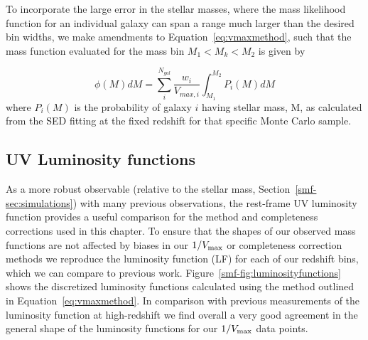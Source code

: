 To incorporate the large error in the stellar masses, where the mass likelihood function for an individual galaxy can span a range much larger than the desired bin widths, we make amendments to Equation~\ref{eq:vmaxmethod}, such that the mass function evaluated for the mass bin $M_{1} < M_{k} < M_{2}$ is given by

\begin{equation}\label{eq:vmaxpdf}
\phi(M) dM = \sum_{i}^{N_{gal}}  \frac{w_{i}}{V_{max,i}} \int_{M_{1}}^{M_{2}} P_{i}(M)dM
\end{equation}
where $P_{i}(M)$ is the probability of galaxy $i$ having stellar mass, M, as calculated from the SED fitting at the fixed redshift for that specific Monte Carlo sample.

\subsection{UV Luminosity functions}
As a more robust observable (relative to the stellar mass, Section~\ref{smf-sec:simulations}) with many previous observations, the rest-frame UV luminosity function provides a useful comparison for the method and completeness corrections used in this chapter. To ensure that the shapes of our observed mass functions are not affected by biases in our $1/V_{\rm{max}}$ or completeness correction methods we reproduce the luminosity function (LF) for each of our redshift bins, which we can compare to previous work. Figure~\ref{smf-fig:luminosityfunctions} shows the discretized luminosity functions calculated using the method outlined in Equation~\ref{eq:vmaxmethod}. In comparison with previous measurements of the luminosity function at high-redshift we find overall a very good agreement in the general shape of the luminosity functions for our $1/V_{\rm{max}}$ data points.

